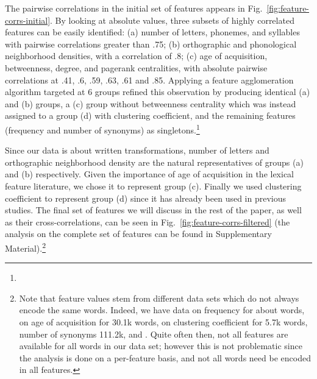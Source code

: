 \begin{new}

The pairwise correlations in the initial set of features appears in Fig.~\ref{fig:feature-corrs-initial}.
By looking at absolute values, three subsets of highly correlated features can be easily identified:
(a) number of letters, phonemes, and syllables with pairwise correlations greater than .75;
(b) orthographic and phonological neighborhood densities, with a correlation of .8;
(c) age of acquisition, betweenness, degree, and pagerank centralities, with absolute pairwise correlations at .41, .6, .59, .63, .61 and .85.
Applying a feature agglomeration algorithm targeted at 6 groups refined this observation by producing identical (a) and (b) groups, a (c) group without betweenness centrality which was instead assigned to a group (d) with clustering coefficient, and the remaining features (frequency and number of synonyms) as singletons.\footnote{
}

Since our data is about written transformations, number of letters and orthographic neighborhood density are the natural representatives of groups (a) and (b) respectively.
Given the importance of age of acquisition in the lexical feature literature, we chose it to represent group (c).
Finally we used clustering coefficient to represent group (d) since it has already been used in previous studies.
The final set of features we will discuss in the rest of the paper, as well as their cross-correlations, can be seen in Fig.~\ref{fig:feature-corrs-filtered} (the analysis on the complete set of features can be found in Supplementary Material).\footnote{
Note that feature values stem from different data sets which do not always encode the same words.
Indeed, we have data on frequency for about  words, on age of acquisition for 30.1k words, on clustering coefficient for 5.7k words, number of synonyms 111.2k, and .
Quite often then, not all features are available for all words in our data set;
however this is not problematic since the analysis is done on a per-feature basis, and not all words need be encoded in all features.}

\end{new}

